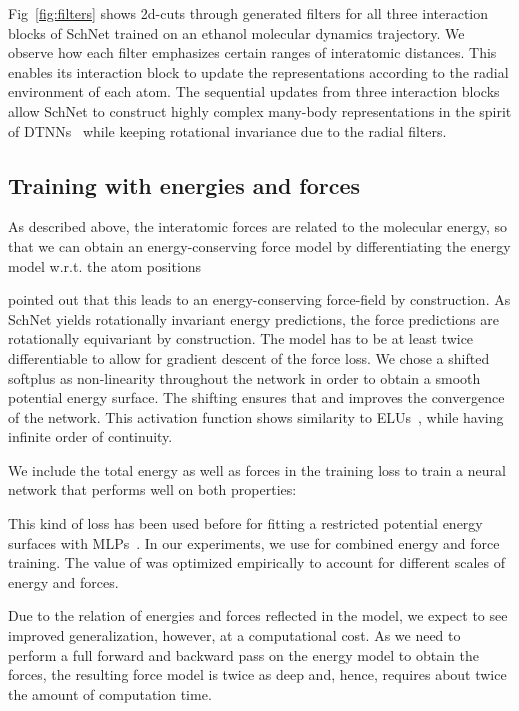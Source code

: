 \documentclass{article}
\begin{document}
Fig~\ref{fig:filters} shows 2d-cuts through generated filters for all three interaction blocks of SchNet trained on an ethanol molecular dynamics trajectory.
We observe how each filter emphasizes certain ranges of interatomic distances.
This enables its interaction block to update the representations according to the radial environment of each atom.
The sequential updates from three interaction blocks allow SchNet to construct highly complex many-body representations in the spirit of DTNNs~\citep{schutt2017quantum} while keeping rotational invariance due to the radial filters.



\subsection{Training with energies and forces}
As described above, the interatomic forces are related to the molecular energy, so that we can obtain an energy-conserving force model by differentiating the energy model w.r.t. the atom positions

\citet{chmiela2017machine} pointed out that this leads to an energy-conserving force-field by construction.
As SchNet yields rotationally invariant energy predictions, the force predictions are rotationally equivariant by construction.
The model has to be at least twice differentiable to allow for gradient descent of the force loss.
We chose a shifted softplus  as non-linearity throughout the network in order to obtain a smooth potential energy surface.
The shifting ensures that  and improves the convergence of the network.
This activation function shows similarity to ELUs~\citep{clevert2015fast}, while having infinite order of continuity.

We include the total energy  as well as forces  in the training loss to train a neural network that performs well on both properties:

This kind of loss has been used before for fitting a restricted potential energy surfaces with MLPs~\citep{pukrittayakamee2009simultaneous}.
In our experiments, we use  for combined energy and force training. The value of  was optimized empirically to account for different scales of energy and forces.

Due to the relation of energies and forces reflected in the model, we expect to see improved generalization, however, at a computational cost.
As we need to perform a full forward and backward pass on the energy model to obtain the forces, the resulting force model is twice as deep and, hence, requires about twice the amount of computation time.
\end{document}
